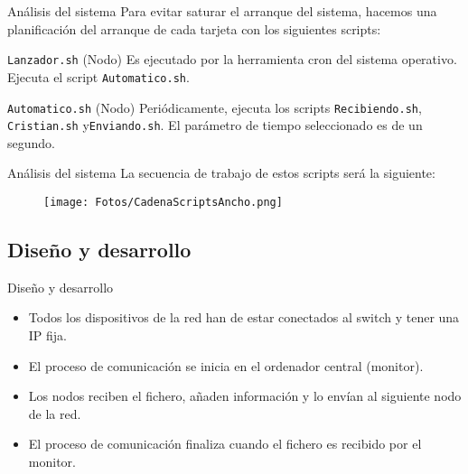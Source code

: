 \documentclass[aspectratio=169]{beamer}
\begin{document}
\begin{frame}{Análisis del sistema}
Para evitar saturar el arranque del sistema, hacemos una planificación del arranque de cada tarjeta con los siguientes scripts:
	\begin{block}{\texttt{Lanzador.sh} (Nodo)}
		Es ejecutado por la herramienta cron del sistema operativo.
		Ejecuta el script \texttt{Automatico.sh}.
	\end{block}
	\begin{block}{\texttt{Automatico.sh} (Nodo)}
		Periódicamente, ejecuta los scripts \texttt{Recibiendo.sh}, \texttt{Cristian.sh} y\texttt{Enviando.sh}.
		El parámetro de tiempo seleccionado es de un segundo. %
	\end{block}
\end{frame}

\begin{frame}{Análisis del sistema}
	La secuencia de trabajo de estos scripts será la siguiente:
	\begin{figure}[h]
		\centering
		\texttt{[image: Fotos/CadenaScriptsAncho.png]}
	\end{figure}
\end{frame}

\subsection{Diseño y desarrollo}
\begin{frame}{Diseño y desarrollo}
\begin{itemize}
	\item Todos los dispositivos de la red han de estar conectados al switch y tener una IP fija.
	\item El proceso de comunicación se inicia en el ordenador central (monitor).
	\item Los nodos reciben el fichero, añaden información y lo envían al siguiente nodo de la red.
	\item El proceso de comunicación finaliza cuando el fichero es recibido por el monitor.
\end{itemize}
\end{frame}
\end{document}
